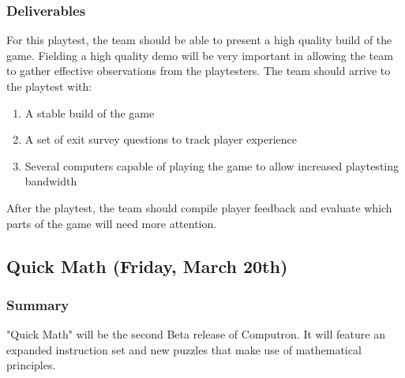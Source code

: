 \subsubsection*{Deliverables}
For this playtest, the team should be able to present a high quality build of the game. Fielding a high quality demo will be very important in allowing the team to gather effective observations from the playtesters. The team should arrive to the playtest with:

\begin{enumerate}
  \item A stable build of the game
  \item A set of exit survey questions to track player experience
  \item Several computers capable of playing the game to allow increased playtesting bandwidth
\end{enumerate}

After the playtest, the team should compile player feedback and evaluate which parts of the game will need more attention.

\subsection{Quick Math (Friday, March 20th)}

\subsubsection*{Summary}
"Quick Math" will be the second Beta release of Computron. It will feature an expanded instruction set and new puzzles that make use of mathematical principles. 

